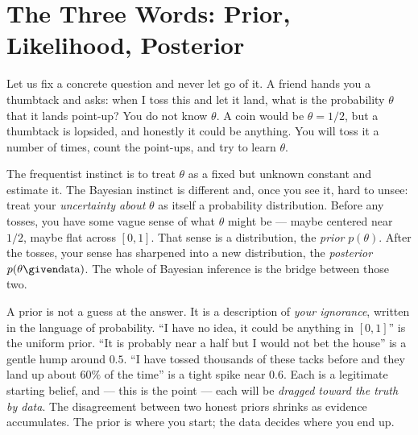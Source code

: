 \chapterline

\section{The Three Words: Prior, Likelihood, Posterior}
\label{ch31:three-words}

Let us fix a concrete question and never let go of it. A friend hands you a thumbtack and
asks: when I toss this and let it land, what is the probability $\theta$ that it lands
point-up? You do not know $\theta$. A coin would be $\theta = 1/2$, but a thumbtack is
lopsided, and honestly it could be anything. You will toss it a number of times, count the
point-ups, and try to learn $\theta$.

The frequentist instinct is to treat $\theta$ as a fixed but unknown constant and estimate
it. The Bayesian instinct is different and, once you see it, hard to unsee: treat your
\emph{uncertainty about} $\theta$ as itself a probability distribution. Before any tosses,
you have some vague sense of what $\theta$ might be --- maybe centered near $1/2$, maybe
flat across $[0,1]$. That sense is a distribution, the \emph{prior} $p(\theta)$. After the
tosses, your sense has sharpened into a new distribution, the \emph{posterior}
$p(\theta \given \text{data})$. The whole of Bayesian inference is the bridge between
those two.

\begin{intuitionbox}
A prior is not a guess at the answer. It is a description of \emph{your ignorance},
written in the language of probability. ``I have no idea, it could be anything in
$[0,1]$'' is the uniform prior. ``It is probably near a half but I would not bet the
house'' is a gentle hump around $0.5$. ``I have tossed thousands of these tacks before and
they land up about $60\%$ of the time'' is a tight spike near $0.6$. Each is a legitimate
starting belief, and --- this is the point --- each will be \emph{dragged toward the
truth by data}. The disagreement between two honest priors shrinks as evidence
accumulates. The prior is where you start; the data decides where you end up.
\end{intuitionbox}

